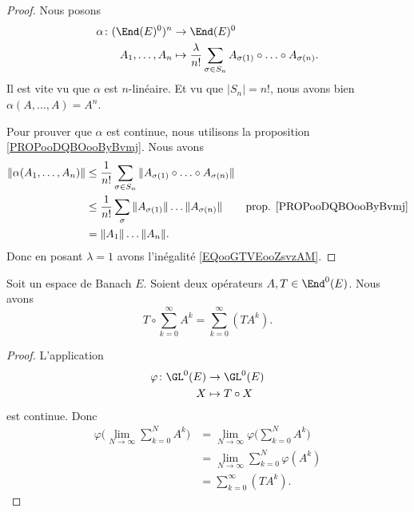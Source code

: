 \begin{proof}
	Nous posons
	\begin{equation}
		\begin{aligned}
			\alpha\colon (\End(E)^0)^n & \to \End(E)^0                                                                               \\
			A_1,\ldots,A_n             & \mapsto \frac{\lambda}{ n!}\sum_{\sigma\in S_n}A_{\sigma(1)}\circ\ldots\circ A_{\sigma(n)}.
		\end{aligned}
	\end{equation}
	Il est vite vu que \( \alpha\) est \( n\)-linéaire. Et vu que \( | S_n |=n!\), nous avons bien \( \alpha(A,\ldots,A)=A^n\).

	Pour prouver que \( \alpha\) est continue, nous utilisons la proposition \ref{PROPooDQBOooByBvmj}. Nous avons
	\begin{subequations}
		\begin{align}
			\| \alpha(A_1,\ldots,A_n) \| & \leq\frac{1}{ n!}\sum_{\sigma\in S_n}\| A_{\sigma(1)}\circ\ldots\circ A_{\sigma(n)} \|                                         \\
			                             & \leq \frac{1}{ n!}\sum_{\sigma}\| A_{\sigma(1)} \|\ldots \| A_{\sigma(n)} \|           & \text{prop. \ref{PROPooDQBOooByBvmj}} \\
			                             & =\| A_1 \|\ldots\| A_n \|.
		\end{align}
	\end{subequations}
	Donc en posant \( \lambda=1\) avons l'inégalité \eqref{EQooGTVEooZsvzAM}.
\end{proof}


\begin{proposition}	\label{PROPooKZNWooLdjDTP}
	Soit un espace de Banach \( E\). Soient deux opérateurs \( A,T\in\End^0(E)\). Nous avons
	\begin{equation}
		T\circ\sum_{k=0}^{\infty}A^k=\sum_{k=0}^{\infty}(TA^k).
	\end{equation}
\end{proposition}

\begin{proof}
	L'application
	\begin{equation}
		\begin{aligned}
			\varphi\colon \GL^0(E) & \to \GL^0(E)     \\
			X                      & \mapsto T\circ X
		\end{aligned}
	\end{equation}
	est continue. Donc
	\begin{subequations}
		\begin{align}
			\varphi\Big( \lim_{N\to \infty}\sum_{k=0}^{N}A^k \Big) & =\lim_{N\to \infty}\varphi\Big( \sum_{k=0}^NA^k \Big) \\
			                                                       & =\lim_{N\to \infty}\sum_{k=0}^N\varphi(A^k)           \\
			                                                       & =\sum_{k=0}^{\infty}(TA^k).
		\end{align}
	\end{subequations}
\end{proof}

